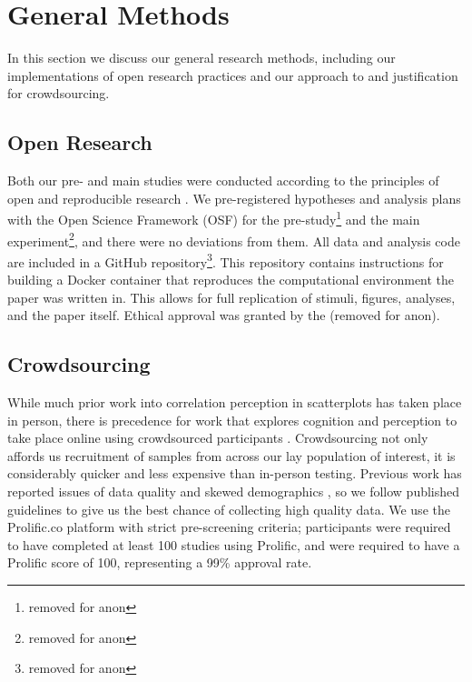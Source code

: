 \documentclass[manuscript,screen,review,anonymous]{acmart}
\begin{document}
\section{General Methods}\label{sec-general-methods}

In this section we discuss our general research methods, including our
implementations of open research practices and our approach to and
justification for crowdsourcing.

\subsection{Open Research}\label{sec-open-research}

Both our pre- and main studies were conducted according to the
principles of open and reproducible research \citep{ayris_2018}. We
pre-registered hypotheses and analysis plans with the Open Science
Framework (OSF) for the pre-study\footnote{removed for anon} and the
main experiment\footnote{removed for anon}, and there were no deviations
from them. All data and analysis code are included in a GitHub
repository\footnote{removed for anon}. This repository contains
instructions for building a Docker container \citep{merkel_2014} that
reproduces the computational environment the paper was written in. This
allows for full replication of stimuli, figures, analyses, and the paper
itself. Ethical approval was granted by the (removed for anon).

\subsection{Crowdsourcing}\label{sec-crowdsourcing}

While much prior work into correlation perception in scatterplots has
taken place in person, there is precedence for work that explores
cognition and perception to take place online using crowdsourced
participants \citep{xiong_2022}. Crowdsourcing not only affords us
recruitment of samples from across our lay population of interest, it is
considerably quicker and less expensive than in-person testing. Previous
work has reported issues of data quality and skewed demographics
\citep{chmielewski_2020, charalambides_2021, peer_2021}, so we follow
published guidelines \citep{peer_2021} to give us the best chance of
collecting high quality data. We use the Prolific.co platform
\citep{prolific} with strict pre-screening criteria; participants were
required to have completed at least 100 studies using Prolific, and were
required to have a Prolific score of 100, representing a 99\% approval
rate.
\end{document}
